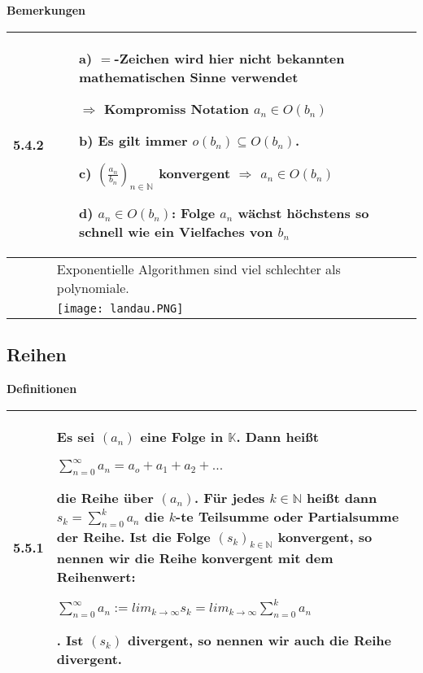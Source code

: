     \noindent
    \textbf{Bemerkungen}
    \begin{table}[H]
    \begin{tabularx}{\textwidth}{X m{16cm}}
        \toprule

        5.4.2 & \begin{itemize}
                    \item[a)] $=$-Zeichen wird hier nicht bekannten mathematischen Sinne verwendet
                    \item[] $\Rightarrow$ Kompromiss Notation $a_n \in O(b_n)$ 
                    \item[b)] Es gilt immer $o(b_n) \subseteq O(b_n)$. 
                    \item[c)] $(\frac{a_n}{b_n})_{n \in \mathbb{N}}$ konvergent $\Rightarrow$ $a_n \in O(b_n)$
                    \item[d)] $a_n \in O(b_n)$: Folge $a_n$ wächst höchstens so schnell wie ein Vielfaches von $b_n$  
                \end{itemize} \\
        \midrule
            & Exponentielle Algorithmen sind viel schlechter als polynomiale. \\
        \midrule
            & \texttt{[image: landau.PNG]} \\

        \bottomrule
    \end{tabularx}
    \end{table}

\subsection{Reihen}
    \noindent
    \textbf{Definitionen}
    \begin{table}[H]  
    \begin{tabularx}{\textwidth}{X m{16cm}}
        \toprule

        5.5.1 & Es sei $(a_n)$ eine Folge in $\mathbb{K}$. Dann heißt \hfill \break
                \centerline{$\sum^{\infty}_{n=0} a_n = a_o + a_1 + a_2 + ... $}
                die \textbf{Reihe} über $(a_n)$. \hfill \break
                Für jedes $k \in \mathbb{N}$ heißt dann $s_k = \sum^{k}_{n=0} a_n$ die $k$-te Teilsumme oder \textbf{Partialsumme} der Reihe. \hfill \break
                Ist die Folge $(s_k)_{k \in \mathbb{N}}$ konvergent, so nennen wir die Reihe \textbf{konvergent} mit dem Reihenwert: \hfill \break
                \centerline{$\sum^{\infty}_{n=0} a_n := lim_{k \rightarrow \infty} s_k = lim_{k \rightarrow \infty} \sum^{k}_{n=0} a_n$}.
                Ist $(s_k)$ divergent, so nennen wir auch die Reihe divergent.  \\

        \bottomrule

    \end{tabularx}
    \end{table}

